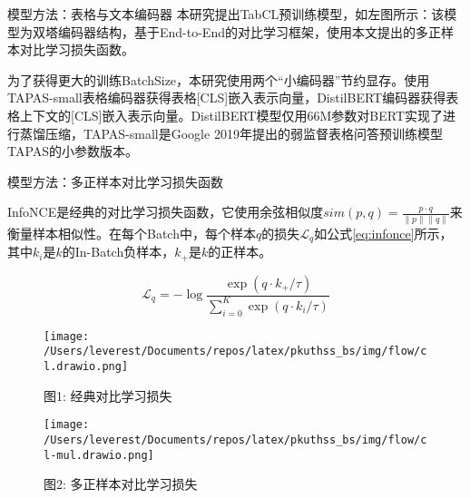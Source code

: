 \documentclass[final,hyperref={pdfpagelabels=false}]{ctexbeamer}
\newcommand{\shrink}{-15pt}
\begin{document}
\begin{frame}[t]
\begin{columns}[t]
  \begin{column}{.3\textwidth} %
    \vspace{\shrink}
    \begin{block}{模型方法：表格与文本编码器}
      本研究提出TabCL预训练模型，如左图所示：该模型为双塔编码器结构，基于End-to-End的对比学习框架，使用本文提出的多正样本对比学习损失函数。
      
      \vspace{4mm}
      为了获得更大的训练BatchSize，本研究使用两个“小编码器”节约显存。使用TAPAS-small表格编码器获得表格[CLS]嵌入表示向量，DistilBERT编码器获得表格上下文的[CLS]嵌入表示向量。DistilBERT模型仅用66M参数对BERT实现了进行蒸馏压缩，TAPAS-small是Google 2019年提出的弱监督表格问答预训练模型TAPAS的小参数版本。
    \end{block}
    
    \begin{block}{模型方法：多正样本对比学习损失函数}

      InfoNCE是经典的对比学习损失函数，它使用余弦相似度$sim(p, q) = \frac{p \cdot q}{\lVert p\rVert \lVert q\rVert}$来衡量样本相似性。在每个Batch中，每个样本$q$的损失$\mathcal{L}_{q}$如公式\ref{eq:infonce}所示，其中$k_i$是$k$的In-Batch负样本，$k_+$是$k$的正样本。
      \begin{footnotesize}
      \begin{equation}
          \label{eq:infonce}
          \mathcal{L}_{q}=-\log \dfrac{\exp \left(q \cdot k_{+} / \tau\right)}{\sum_{i=0}^{K} \exp \left(q \cdot k_{i} / \tau\right)}
      \end{equation}
      \end{footnotesize}

      \begin{figure}[htb]
        \begin{minipage}{0.5\textwidth}
          \centering
          \texttt{[image: /Users/leverest/Documents/repos/latex/pkuthss\_bs/img/flow/cl.drawio.png]}
          \caption{\scriptsize 图1: 经典对比学习损失}
          \label{infonce}
        \end{minipage}\hfill
        \begin{minipage}{0.5\textwidth}
          \centering
          \texttt{[image: /Users/leverest/Documents/repos/latex/pkuthss\_bs/img/flow/cl-mul.drawio.png]}
          \caption{\scriptsize 图2: 多正样本对比学习损失}
          \label{mul-infonce}
        \end{minipage}
      \end{figure}


\end{block}
\end{column}
\end{columns}
\end{frame}
\end{document}
